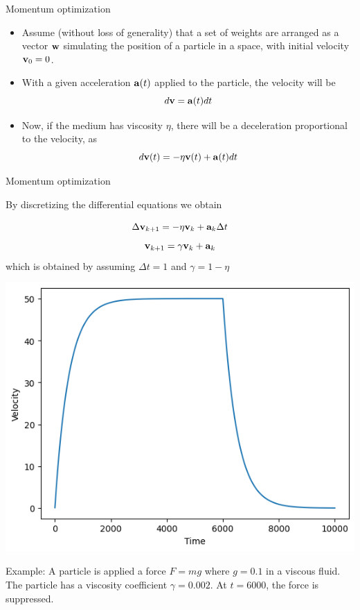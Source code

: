 \documentclass{beamer}
\begin{document}
\begin{frame}{Momentum optimization}
    \begin{itemize}
        \item Assume (without loss of generality) that a set of weights are arranged as a vector ${\bf w}$ simulating the position of a particle in a space, with initial velocity ${\bf v}_0=0$.
        \item With a given acceleration ${\bf a}(t)$ applied to the particle, the velocity will be
        $$
        d{\bf v} =  {\bf a}(t) d t
        $$
    \item Now, if the medium has viscosity $\eta$, there will be a deceleration proportional to  the velocity, as
   $$
        d {\bf v}(t) =  -\eta {\bf v}(t)  + {\bf a}(t) dt
    $$
    \end{itemize}
\end{frame}

\begin{frame}{Momentum optimization}

By discretizing the differential equations we obtain

$$
\Delta{\bf v}_{k+1} = -\eta {\bf v}_k + {\bf a}_k \Delta t 
$$
$$
{\bf v}_{k+1} = \gamma {\bf v}_k + {\bf a}_k  
$$
which is obtained by assuming $\Delta t =1$ and $\gamma = 1-\eta$
\begin{multicols}{2}
\includegraphics[scale=0.3]{Module 1 (NN)/pics/viscosity.png}

Example: A particle is applied a force $F=mg$ where $g=0.1$ in a viscous fluid. The particle has a viscosity coefficient $\gamma=0.002$. At $t=6000$, the force is suppressed.  

\columnbreak

\end{multicols}
\end{frame}
\end{document}
